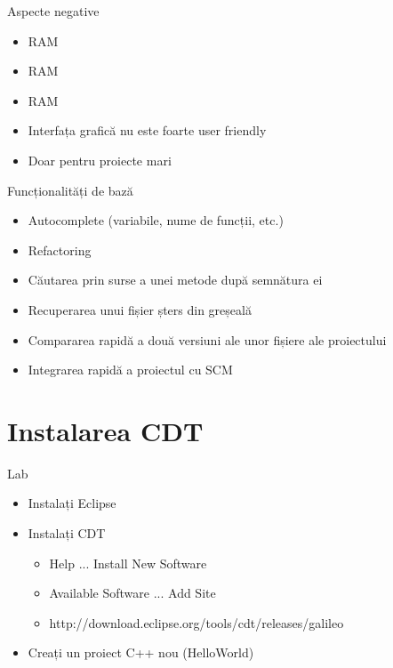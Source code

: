 \documentclass{beamer}
\begin{document}
\begin{frame}{Aspecte negative}
  \begin{itemize}
  \pause
  \item RAM
  \pause
  \item RAM
  \pause
  \item RAM
  \pause
  \item Interfața grafică nu este foarte user friendly 
  \pause 
  \item Doar pentru proiecte mari
  \pause
\end{itemize}
\end{frame}

\begin{frame}{Funcționalități de bază}
    \begin{itemize}
    \pause
    \item Autocomplete (variabile, nume de funcții, etc.)
    \pause
    \item Refactoring
    \pause
    \item Căutarea prin surse a unei metode după semnătura ei
    \pause
    \item Recuperarea unui fișier șters din greșeală
    \pause
    \item Compararea rapidă a două versiuni ale unor fișiere ale proiectului 
    \pause
    \item Integrarea rapidă a proiectul cu SCM
    \end{itemize}
\end{frame}

\section{Instalarea CDT}

\begin{frame}{Lab}
  \begin{itemize}
  \item Instalați Eclipse
  \pause
  \item Instalați CDT
    \begin{itemize} 
    \pause
    \item Help ... Install New Software
    \pause
    \item Available Software ... Add Site
    \item http://download.eclipse.org/tools/cdt/releases/galileo
    \end{itemize}
  \item Creați un proiect C++ nou (HelloWorld)
  \end{itemize}
\end{frame}
\end{document}
